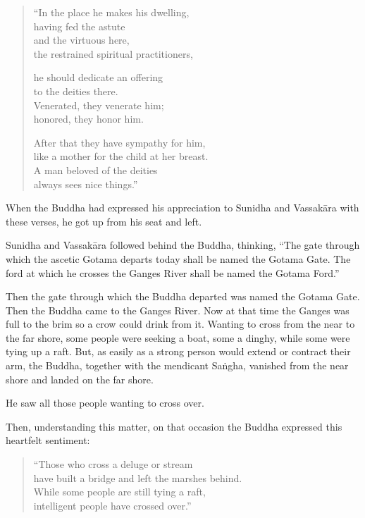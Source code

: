 \documentclass[12pt,openany]{book}%
\begin{document}
\begin{verse}%
“In the place he makes his dwelling, \\
having fed the astute \\
and the virtuous here, \\
the restrained spiritual practitioners, 

he should dedicate an offering \\
to the deities there. \\
Venerated, they venerate him; \\
honored, they honor him. 

After that they have sympathy for him, \\
like a mother for the child at her breast. \\
A man beloved of the deities \\
always sees nice things.” 

%
\end{verse}

When the Buddha had expressed his appreciation to Sunidha and \textsanskrit{Vassakāra} with these verses, he got up from his seat and left. 

Sunidha and \textsanskrit{Vassakāra} followed behind the Buddha, thinking, “The gate through which the ascetic Gotama departs today shall be named the Gotama Gate. The ford at which he crosses the Ganges River shall be named the Gotama Ford.” 

Then the gate through which the Buddha departed was named the Gotama Gate. Then the Buddha came to the Ganges River. Now at that time the Ganges was full to the brim so a crow could drink from it. Wanting to cross from the near to the far shore, some people were seeking a boat, some a dinghy, while some were tying up a raft. But, as easily as a strong person would extend or contract their arm, the Buddha, together with the mendicant \textsanskrit{Saṅgha}, vanished from the near shore and landed on the far shore. 

He saw all those people wanting to cross over. 

Then, understanding this matter, on that occasion the Buddha expressed this heartfelt sentiment: 

\begin{verse}%
“Those who cross a deluge or stream \\
have built a bridge and left the marshes behind. \\
While some people are still tying a raft, \\
intelligent people have crossed over.” 

%
\end{verse}
\end{document}

